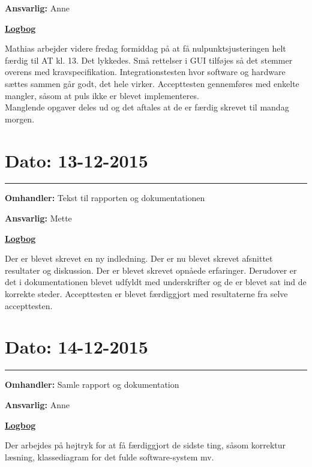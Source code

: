\textbf{Ansvarlig:} Anne 

\underline{\textbf{Logbog}}

Mathias arbejder videre fredag formiddag på at få nulpunktsjusteringen helt færdig til AT kl. 13. Det lykkedes. Små rettelser i GUI tilføjes så det stemmer overens med kravspecifikation. 
Integrationstesten hvor software og hardware sættes sammen går godt, det hele virker. Accepttesten gennemføres med enkelte mangler, såsom at puls ikke er blevet implementeres.\\
Manglende opgaver deles ud og det aftales at de er færdig skrevet til mandag morgen.
\\

\section{Dato: 13-12-2015}
\hrule
\textbf{Omhandler:} Tekst til rapporten og dokumentationen 

\textbf{Ansvarlig:} Mette 

\underline{\textbf{Logbog}}

Der er blevet skrevet en ny indledning. Der er nu blevet skrevet afsnittet resultater og diskussion. Der er blevet skrevet opnåede erfaringer. Derudover er det i dokumentationen blevet udfyldt med underskrifter og de er blevet sat ind de korrekte steder. Accepttesten er blevet færdiggjort med resultaterne fra selve accepttesten. 
\\

\section{Dato: 14-12-2015}
\hrule
\textbf{Omhandler:} Samle rapport og dokumentation

\textbf{Ansvarlig:} Anne

\underline{\textbf{Logbog}}

Der arbejdes på højtryk for at få færdiggjort de sidste ting, såsom korrektur læsning, klassediagram for det fulde software-system mv.
\\